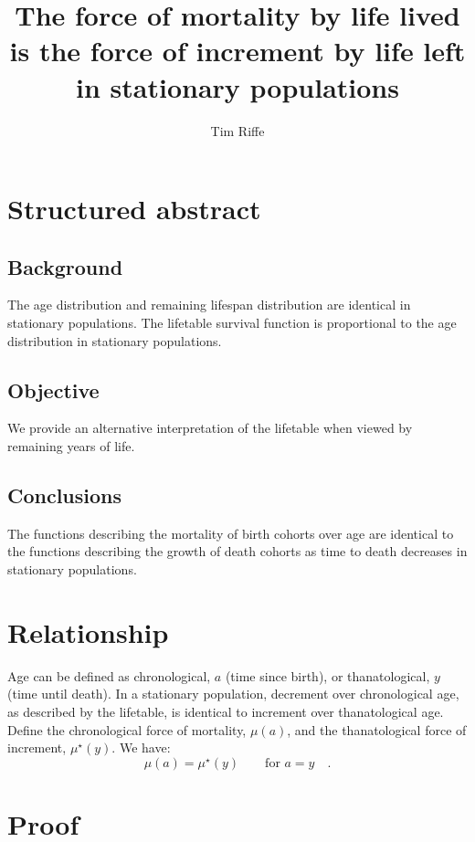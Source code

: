 \documentclass[leqno]{article}
\begin{document}
\title{The force of mortality by life lived is the force of increment by life
left in stationary populations}
\author{Tim Riffe}
\maketitle
\section*{Structured abstract}

\subsection*{Background}
The age distribution and remaining lifespan distribution are identical in
stationary populations. The lifetable survival function is proportional to the
age distribution in stationary populations.

\subsection*{Objective}
We provide an alternative interpretation of the lifetable when viewed by
remaining years of life.

\subsection*{Conclusions}
The functions describing the mortality of birth cohorts over age are identical
to the functions describing the growth of death cohorts as time to death decreases in stationary populations.
\vspace{2cm}
\section*{Relationship}

Age can be defined as chronological, $a$ (time since birth), or thanatological,
$y$ (time until death). In a stationary population, decrement over
chronological age, as described by the lifetable, is
identical to increment over thanatological age. Define the chronological force
of mortality, $\mu(a)$, and the thanatological force of increment,
$\mu^\star(y)$. We have:
\begin{equation}
\mu(a) = \mu^\star(y)\quad\quad\text{for~}a=y\quad \text{.}
\end{equation}

\section*{Proof}
\end{document}
